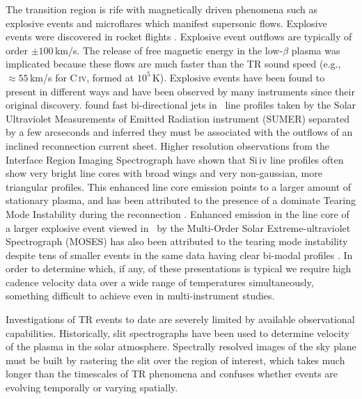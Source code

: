     The transition region is rife with magnetically driven phenomena such as explosive events \cite[e.g.,][]{dere1991} and microflares \citep{gontikakis2012} which manifest supersonic flows.
    Explosive events were discovered in rocket flights \citep{Dere1989}. 
    Explosive event outflows are typically of order $\pm 100$\,km/s. 
    The release of free magnetic energy in the low-$\beta$ plasma was implicated because these flows are much faster than the TR sound speed (e.g., $\approx55$\,km/s  for C\,\textsc{iv}, formed at $10^5$\,K).
    Explosive events have been found to present in different ways and have been observed by many instruments since their original discovery.
    \citet{innes1997} found fast bi-directional jets in \siiv \ line profiles taken by the Solar Ultraviolet Measurements of Emitted Radiation instrument (SUMER)  \citep{SUMER} separated by a few arcseconds and inferred they must be associated with the outflows of an inclined reconnection current sheet.
    Higher resolution observations from the Interface Region Imaging Spectrograph \citep[IRIS]{depontieu2014} have shown that Si\,{\sc iv} line profiles often show very bright line cores with broad wings and very non-gaussian, more triangular profiles.
    This enhanced line core emission points to a larger amount of stationary plasma, and has been attributed to the presence of a dominate Tearing Mode Instability during the reconnection \citep{Innes2015}.
    Enhanced emission in the line core of a larger explosive event viewed in \heii \ by the Multi-Order Solar Extreme-ultraviolet Spectrograph (MOSES)  has also been attributed to the tearing mode instability \citep{Fox10} despite tens of smaller events in the same data having clear bi-modal profiles \citep{Rust2019}.
    In order to determine which, if any, of these presentations is typical we require high cadence velocity data over a wide range of temperatures simultaneously, something difficult to achieve even in multi-instrument studies.
    
    
    Investigations of TR events to date are severely limited by available observational capabilities. 
    Historically, slit spectrographs have been used to determine velocity of the plasma in the solar atmosphere.   
    Spectrally resolved images of the sky plane must be built by rastering the slit over the region of interest, which takes much longer than the timescales of TR phenomena and confuses whether events are evolving temporally or varying spatially.  
    
